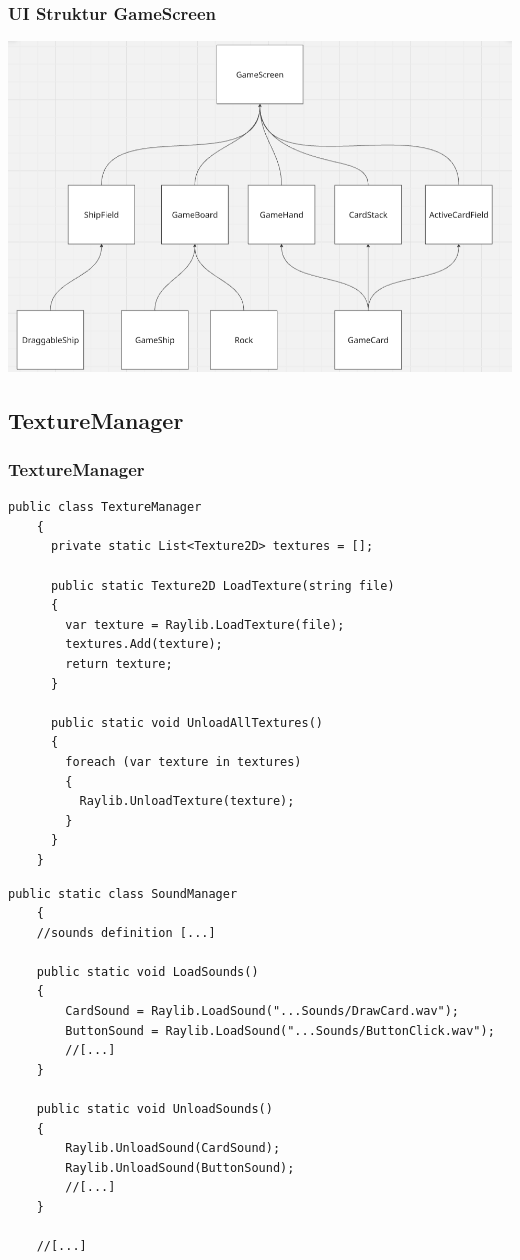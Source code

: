 \documentclass{beamer}
\begin{document}
\begin{frame}
  \frametitle{UI Struktur GameScreen}
  \includegraphics[width=\textwidth]{UI-Struktur.png}
\end{frame}

\subsection{TextureManager}
\begin{frame}[fragile]
\frametitle{TextureManager}
\begin{multicols}{2}
  
  \begin{lstlisting}[language=CSharp, basicstyle=\ttfamily\tiny, breaklines=true]
    public class TextureManager
    {
      private static List<Texture2D> textures = [];
      
      public static Texture2D LoadTexture(string file)
      {
        var texture = Raylib.LoadTexture(file);
        textures.Add(texture);
        return texture;
      }
        
      public static void UnloadAllTextures()
      {
        foreach (var texture in textures)
        {
          Raylib.UnloadTexture(texture);
        }
      }
    }
  \end{lstlisting}
  \columnbreak
  \begin{lstlisting}[language=CSharp, basicstyle=\ttfamily\tiny, breaklines=true]
    public static class SoundManager
    {
    //sounds definition [...]

    public static void LoadSounds()
    {
        CardSound = Raylib.LoadSound("...Sounds/DrawCard.wav");
        ButtonSound = Raylib.LoadSound("...Sounds/ButtonClick.wav");
        //[...]
    }

    public static void UnloadSounds()
    {
        Raylib.UnloadSound(CardSound);
        Raylib.UnloadSound(ButtonSound);
        //[...]
    }
    
    //[...]
  \end{lstlisting}
\end{multicols}
\end{frame}
\end{document}
